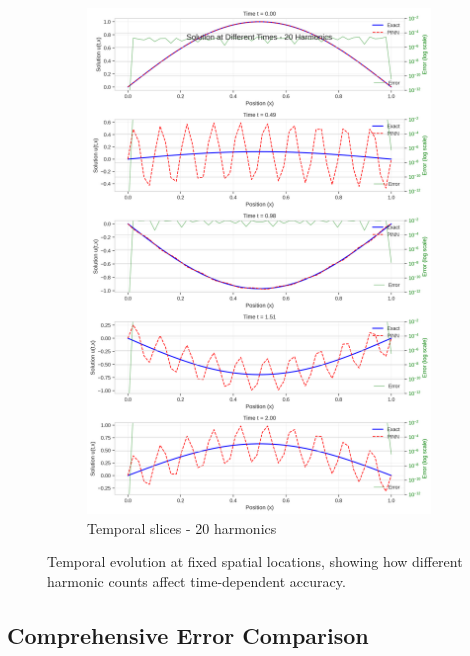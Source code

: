 \begin{figure}[H]
\begin{subfigure}[b]{0.48\textwidth}
        \includegraphics[width=\textwidth]{figures/time_slices_20h.png}
        \caption{Temporal slices - 20 harmonics}
    \end{subfigure}
    \caption{Temporal evolution at fixed spatial locations, showing how different harmonic counts affect time-dependent accuracy.}
    \label{fig:time_slice_comparison}
\end{figure}

\subsection{Comprehensive Error Comparison}

